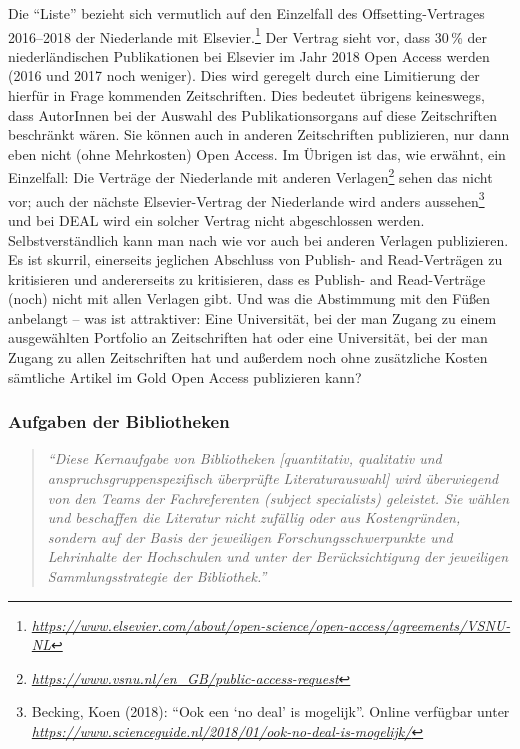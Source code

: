 \documentclass[a4paper,
fontsize=11pt,
oneside,
numbers=noperiodatend,
parskip=half-,
bibliography=totoc,
final
]{scrartcl}
\begin{document}
Die \enquote{Liste} bezieht sich vermutlich auf den Einzelfall des
Offsetting-Vertrages 2016--2018 der Niederlande mit Elsevier.\footnote{\href{https://www.elsevier.com/about/open-science/open-access/agreements/VSNU-NL}{\emph{https://www.elsevier.com/about/open-science/open-access/agreements/VSNU-NL}}}
Der Vertrag sieht vor, dass 30\,\% der niederländischen Publikationen
bei Elsevier im Jahr 2018 Open Access werden (2016 und 2017 noch
weniger). Dies wird geregelt durch eine Limitierung der hierfür in Frage
kommenden Zeitschriften. Dies bedeutet übrigens keineswegs, dass
AutorInnen bei der Auswahl des Publikationsorgans auf diese
Zeitschriften beschränkt wären. Sie können auch in anderen Zeitschriften
publizieren, nur dann eben nicht (ohne Mehrkosten) Open Access. Im
Übrigen ist das, wie erwähnt, ein Einzelfall: Die Verträge der
Niederlande mit anderen Verlagen\footnote{\href{https://www.vsnu.nl/en_GB/public-access-request}{\emph{https://www.vsnu.nl/en\_GB/public-access-request}}}
sehen das nicht vor; auch der nächste Elsevier-Vertrag der Niederlande
wird anders aussehen\footnote{Becking, Koen (2018): \enquote{Ook een
  \enquote{no deal} is mogelijk}. Online verfügbar unter
  \href{https://www.scienceguide.nl/2018/01/ook-no-deal-is-mogelijk/}{\emph{https://www.scienceguide.nl/2018/01/ook-no-deal-is-mogelijk/}}}
und bei DEAL wird ein solcher Vertrag nicht abgeschlossen werden.
Selbstverständlich kann man nach wie vor auch bei anderen Verlagen
publizieren. Es ist skurril, einerseits jeglichen Abschluss von Publish-
and Read-Verträgen zu kritisieren und andererseits zu kritisieren, dass
es Publish- and Read-Verträge (noch) nicht mit allen Verlagen gibt. Und
was die Abstimmung mit den Füßen anbelangt -- was ist attraktiver: Eine
Universität, bei der man Zugang zu einem ausgewählten Portfolio an
Zeitschriften hat oder eine Universität, bei der man Zugang zu allen
Zeitschriften hat und außerdem noch ohne zusätzliche Kosten sämtliche
Artikel im Gold Open Access publizieren kann?

\subsubsection{Aufgaben der
Bibliotheken}\label{aufgaben-der-bibliotheken}

\begin{quote}
\emph{\enquote{Diese Kernaufgabe von Bibliotheken {[}quantitativ,
qualitativ und anspruchsgruppenspezifisch überprüfte Literaturauswahl{]}
wird überwiegend von den Teams der Fachreferenten (subject specialists)
geleistet. Sie wählen und beschaffen die Literatur nicht zufällig oder
aus Kostengründen, sondern auf der Basis der jeweiligen
Forschungsschwerpunkte und Lehrinhalte der Hochschulen und unter der
Berücksichtigung der jeweiligen Sammlungsstrategie der Bibliothek.}}
\end{quote}
\end{document}
